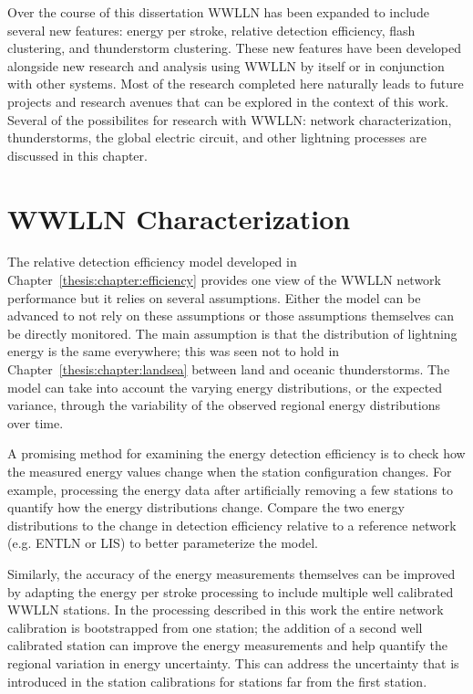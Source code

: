 Over the course of this dissertation WWLLN has been expanded to include several new features: energy per stroke, relative detection efficiency, flash clustering, and thunderstorm clustering.
These new features have been developed alongside new research and analysis using WWLLN by itself or in conjunction with other systems.
Most of the research completed here naturally leads to future projects and research avenues that can be explored in the context of this work.
Several of the possibilites for research with WWLLN: network characterization, thunderstorms, the global electric circuit, and other lightning processes are discussed in this chapter.

\section{WWLLN Characterization}

The relative detection efficiency model developed in Chapter~\ref{thesis:chapter:efficiency} provides one view of the WWLLN network performance but it relies on several assumptions.
Either the model can be advanced to not rely on these assumptions or those assumptions themselves can be directly monitored.
The main assumption is that the distribution of lightning energy is the same everywhere; this was seen not to hold in Chapter~\ref{thesis:chapter:landsea} between land and oceanic thunderstorms.
The model can take into account the varying energy distributions, or the expected variance, through the variability of the observed regional energy distributions over time.

A promising method for examining the energy detection efficiency is to check how the measured energy values change when the station configuration changes.
For example, processing the energy data after artificially removing a few stations to quantify how the energy distributions change.
Compare the two energy distributions to the change in detection efficiency relative to a reference network (e.g. ENTLN or LIS) to better parameterize the model.

Similarly, the accuracy of the energy measurements themselves can be improved by adapting the energy per stroke processing to include multiple well calibrated WWLLN stations.
In the processing described in this work the entire network calibration is bootstrapped from one station; the addition of a second well calibrated station can improve the energy measurements and help quantify the regional variation in energy uncertainty.
This can address the uncertainty that is introduced in the station calibrations for stations far from the first station.

